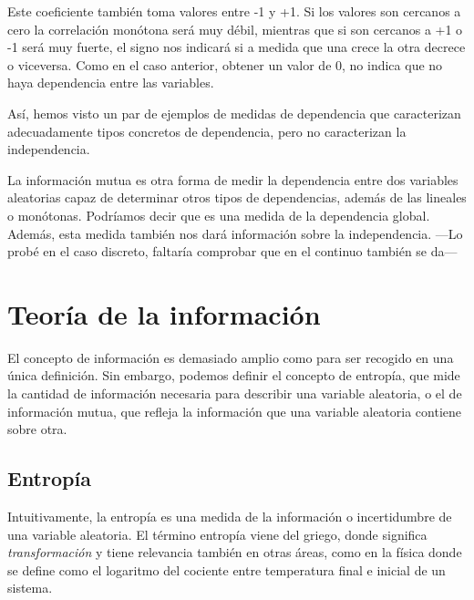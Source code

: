 \documentclass[10pt,a4paper]{article} %
\theoremstyle{definition}
\begin{document}
Este coeficiente también toma valores entre -1 y +1. Si los valores son cercanos a cero la correlación monótona será muy débil, mientras que si son cercanos a +1 o -1 será muy fuerte, el signo nos indicará si a medida que una crece la otra decrece o viceversa. Como en el caso anterior, obtener un valor de 0, no indica que no haya dependencia entre las variables.

Así, hemos visto un par de ejemplos de medidas de dependencia que caracterizan adecuadamente tipos concretos de dependencia, pero no caracterizan la independencia.

La información mutua es otra forma de medir la dependencia entre dos variables aleatorias capaz de determinar otros tipos de dependencias, además de las lineales o monótonas. Podríamos decir que es una medida de la dependencia global. Además, esta medida también nos dará información sobre la independencia. ---Lo probé en el caso discreto, faltaría comprobar que en el continuo también se da---

    \section{Teoría de la información}

    El concepto de información es demasiado amplio como para ser recogido en una única definición. Sin embargo, podemos definir el concepto de entropía, que mide la cantidad de información necesaria para describir una variable aleatoria, o el de información mutua, que refleja la información que una variable aleatoria contiene sobre otra.

    \subsection{Entropía}

    Intuitivamente, la entropía es una medida de la información o incertidumbre de una variable aleatoria. El término entropía viene del griego, donde significa \textit{transformación} y tiene relevancia también en otras áreas, como en la física donde se define como el logaritmo del cociente entre temperatura final e inicial de un sistema.
\end{document}
